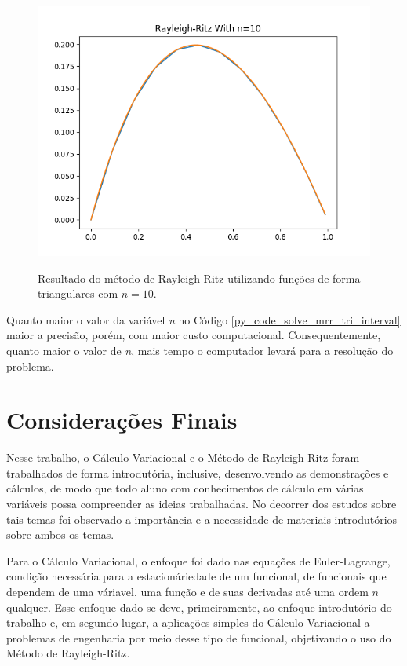 \documentclass[
	12pt,				%
	openright,			%
    twoside,			%
	a4paper,			%
	english,			%
	french,				%
	spanish,			%
	brazil				%
	]{abntex2}
\numberwithin{lema}{chapter}
\numberwithin{teorema}{chapter}
\numberwithin{definicao}{chapter}
\numberwithin{exemplo}{chapter}
\numberwithin{figure}{chapter}
\begin{document}
\begin{figure}[h]
	\caption{Resultado do método de Rayleigh-Ritz utilizando funções de forma triangulares com $n=10$.}
	\centering
	\includegraphics[scale=0.6]{../figuras/code/code_plot_mrr_triangulate_n10.png}
	\label{fig:code_plot_mrr_triangulate_n10}
\end{figure}

Quanto maior o valor da variável \textit{n} no Código \ref{py_code_solve_mrr_tri_interval} maior a precisão, porém, com maior custo computacional. Consequentemente, quanto maior o valor de \textit{n}, mais tempo o computador levará para a resolução do problema.

\chapter*{Considerações Finais}

Nesse trabalho, o Cálculo Variacional e o Método de Rayleigh-Ritz foram trabalhados de forma introdutória, inclusive, desenvolvendo as demonstrações e cálculos, de modo que todo aluno com conhecimentos de cálculo em várias variáveis possa compreender as ideias trabalhadas. No decorrer dos estudos sobre tais temas foi observado a importância e a necessidade de materiais introdutórios sobre ambos os temas.

Para o Cálculo Variacional, o enfoque foi dado nas equações de Euler-Lagrange, condição necessária para a estacionáriedade de um funcional, de funcionais que dependem de uma váriavel, uma função e de suas derivadas até uma ordem $n$ qualquer. Esse enfoque dado se deve, primeiramente, ao enfoque introdutório do trabalho e, em segundo lugar, a aplicações simples do Cálculo Variacional a problemas de engenharia por meio desse tipo de funcional, objetivando o uso do Método de Rayleigh-Ritz.
\end{document}
